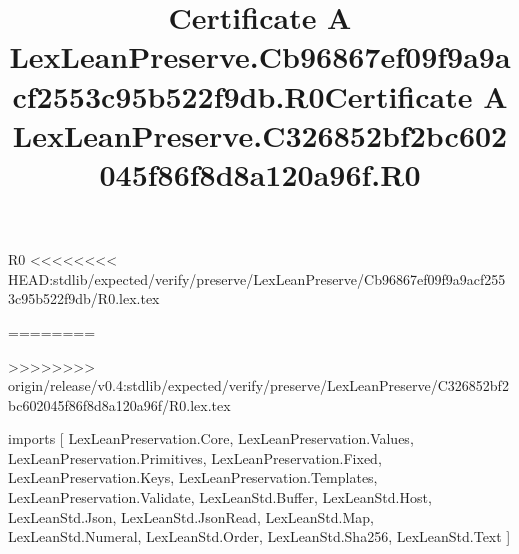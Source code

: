 \begin{lexlean}{R0}
<<<<<<<< HEAD:stdlib/expected/verify/preserve/LexLeanPreserve/Cb96867ef09f9a9acf2553c95b522f9db/R0.lex.tex
\title{Certificate A LexLeanPreserve.Cb96867ef09f9a9acf2553c95b522f9db.R0}
========
\title{Certificate A LexLeanPreserve.C326852bf2bc602045f86f8d8a120a96f.R0}
>>>>>>>> origin/release/v0.4:stdlib/expected/verify/preserve/LexLeanPreserve/C326852bf2bc602045f86f8d8a120a96f/R0.lex.tex
\begin{coremodule}
imports [
  LexLeanPreservation.Core,
  LexLeanPreservation.Values,
  LexLeanPreservation.Primitives,
  LexLeanPreservation.Fixed,
  LexLeanPreservation.Keys,
  LexLeanPreservation.Templates,
  LexLeanPreservation.Validate,
  LexLeanStd.Buffer,
  LexLeanStd.Host,
  LexLeanStd.Json,
  LexLeanStd.JsonRead,
  LexLeanStd.Map,
  LexLeanStd.Numeral,
  LexLeanStd.Order,
  LexLeanStd.Sha256,
  LexLeanStd.Text
]


\end{coremodule}
\end{lexlean}
